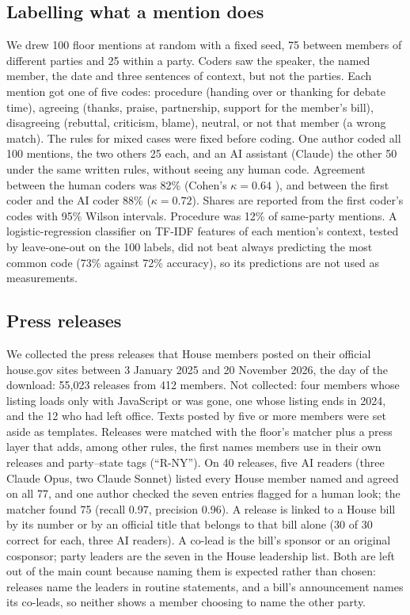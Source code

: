 \documentclass[9pt,twocolumn,twoside]{pnas-new}
\begin{document}
{\subsection*{Labelling what a mention does}
We drew 100 floor mentions at random with a fixed seed, 75 between members of different parties and 25 within a
party. Coders saw the speaker, the named member, the date and three sentences of context, but not the parties. Each
mention got one of five codes: procedure (handing over or thanking for debate time), agreeing (thanks, praise,
partnership, support for the member's bill), disagreeing (rebuttal, criticism, blame), neutral, or not that member (a
wrong match). The rules for mixed cases were fixed before coding. One author coded all 100 mentions, the two others
25 each, and an AI assistant (Claude) the other 50 under the same written rules, without seeing any human code.
Agreement between the human coders was 82\% (Cohen's $\kappa = 0.64$ \cite{cohen1960}), and between the first coder
and the AI coder 88\% ($\kappa = 0.72$). Shares are reported from the first coder's codes with 95\% Wilson intervals. Procedure was 12\% of same-party mentions.
A logistic-regression classifier on TF-IDF features of each mention's context, tested by leave-one-out on the 100
labels, did not beat always predicting the most common code (73\% against 72\% accuracy), so its predictions are not
used as measurements.

\subsection*{Press releases}
We collected the press releases that House members posted on their official house.gov sites between 3 January 2025
and 20 November 2026, the day of the download: 55,023 releases from 412 members. Not collected: four members whose
listing loads only with JavaScript or was gone, one whose listing ends in 2024, and the 12 who had left office. Texts
posted by five or more members were set aside as templates. Releases were matched with the floor's matcher plus a
press layer that adds, among other rules, the first names members use in their own releases and party--state tags
(``R-NY''). On 40 releases, five AI readers (three Claude Opus, two Claude Sonnet) listed every House member named and agreed on all 77, and
one author checked the seven entries flagged for a human look; the matcher found 75 (recall 0.97, precision 0.96). A
release is linked to a House bill by its number or by an official title that belongs to that bill alone (30 of 30
correct for each, three AI readers). A co-lead is the bill's sponsor or an original cosponsor; party leaders are the seven in the House leadership list. Both are left out of the main count because naming them is
expected rather than chosen: releases name the leaders in routine statements, and a bill's announcement names its
co-leads, so neither shows a member choosing to name the other party.

}
\end{document}
